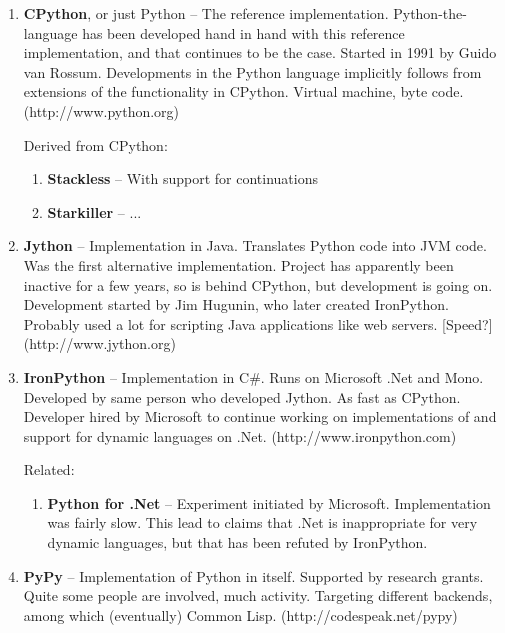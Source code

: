 \documentclass{article}
\begin{document}
\begin{enumerate}

 \item{{\bf CPython}, or just Python} -- The reference
   implementation. Python-the-language has been developed hand in hand
   with this reference implementation, and that continues to be the
   case. Started in 1991 by Guido van Rossum. Developments in the
   Python language implicitly follows from extensions of the
   functionality in CPython. Virtual machine, byte
   code. (http://www.python.org)

   Derived from CPython:
   \begin{enumerate}
    \item{{\bf Stackless}} -- With support for continuations
    \item{{\bf Starkiller}} -- ...
   \end{enumerate}

 \item{{\bf Jython}} -- Implementation in Java. Translates Python code
   into JVM code. Was the first alternative implementation. Project
   has apparently been inactive for a few years, so is behind CPython,
   but development is going on. Development started by Jim Hugunin,
   who later created IronPython. Probably used a lot for scripting
   Java applications like web servers. [Speed?]
   (http://www.jython.org)

 \item{{\bf IronPython}} -- Implementation in C\#. Runs on Microsoft .Net
   and Mono. Developed by same person who developed Jython. As fast as
   CPython. Developer hired by Microsoft to continue working on
   implementations of and support for dynamic languages on
   .Net. (http://www.ironpython.com)

   Related:
   \begin{enumerate}
    \item{{\bf Python for .Net}} -- Experiment initiated by Microsoft. Implementation
        was fairly slow. This lead to claims that .Net is inappropriate for
        very dynamic languages, but that has been refuted by IronPython. 
   \end{enumerate}

 \item{{\bf PyPy}} -- Implementation of Python in itself. Supported by
    research grants. Quite some people are involved, much
    activity. Targeting different backends, among which (eventually)
    Common Lisp. (http://codespeak.net/pypy)
  
\end{enumerate}
\end{document}
